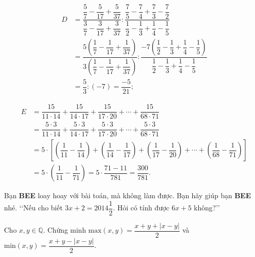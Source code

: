 \begin{bt}
{\begin{listEX}
		\item 
		\begin{eqnarray*}
			& D & = \dfrac{\dfrac{5}{7}-\dfrac{5}{17}+\dfrac{5}{37}}{\dfrac{3}{7}-\dfrac{3}{17}+\dfrac{3}{37}}:\dfrac{\dfrac{7}{5}-\dfrac{7}{4}+\dfrac{7}{3}-\dfrac{7}{2}}{\dfrac{1}{2}-\dfrac{1}{3}+\dfrac{1}{4}-\dfrac{1}{5}} \\
			& &=\dfrac{5\left( \dfrac{1}{7}-\dfrac{1}{17}+\dfrac{1}{37} \right)}{3\left( \dfrac{1}{7}-\dfrac{1}{17}+\dfrac{1}{37} \right)}:\dfrac{-7\left( \dfrac{1}{2}-\dfrac{1}{3}+\dfrac{1}{4}-\dfrac{1}{5} \right)}{\dfrac{1}{2}-\dfrac{1}{3}+\dfrac{1}{4}-\dfrac{1}{5}}  \\
			& & = \dfrac{5}{3}:(-7) =\dfrac{-5}{21};
		\end{eqnarray*}
		\item \begin{eqnarray*}
			& E &=\dfrac{15}{11 \cdot 14} + \dfrac{15}{14 \cdot 17} + \dfrac{15}{17 \cdot 20}+ \cdots + \dfrac{15}{68 \cdot 71}  \\
			& &=\dfrac{5\cdot 3}{11 \cdot 14} + \dfrac{5\cdot 3}{14 \cdot 17} + \dfrac{5\cdot 3}{17 \cdot 20}+ \cdots + \dfrac{5\cdot 3}{68 \cdot 71} \\
			& &=5\cdot \left[ \left( \dfrac{1}{11} - \dfrac{1}{14} \right) + \left( \dfrac{1}{14} - \dfrac{1}{17} \right) + \left( \dfrac{1}{17} - \dfrac{1}{20} \right) + \cdots + \left( \dfrac{1}{68} - \dfrac{1}{71} \right) \right] \\
			& &=5\cdot \left(\dfrac{1}{11}-\dfrac{1}{71}\right) = 5 \cdot \dfrac{71-11}{781}=\dfrac{300}{781}.
		\end{eqnarray*}
	\end{listEX}	
}	
\end{bt}
\begin{bt}%
	Bạn \textbf{BEE} loay hoay với bài toán, mà không làm được. Bạn hãy giúp bạn \textbf{BEE} nhé. \lq \lq Nếu cho biết $3x+2=2014\dfrac{1}{2}$. Hỏi có tính được $6x+5$ không?\rq\rq
\end{bt}
\begin{bt}%
	Cho $x,y \in \mathbb{Q}$. Chứng minh $\text{max}(x,y) = \dfrac{x+y+|x-y|}{2}$ và $\text{min}(x,y)=\dfrac{x+y-|x-y|}{2}$.
\end{bt}
